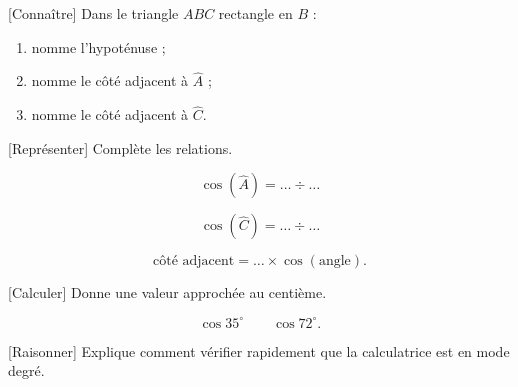 \documentclass[12pt,a4paper]{article}
\begin{document}

[Connaître]
Dans le triangle \(ABC\) rectangle en \(B\) : 

\begin{enumerate}[label=\alph*)]
  \item nomme l'hypoténuse ;
  \item nomme le côté adjacent à \(\widehat A\) ;
  \item nomme le côté adjacent à \(\widehat C\).
\end{enumerate}


[Représenter]
Complète les relations. 

\[
\cos(\widehat A)=\ldots\div\ldots
\]

\[
\cos(\widehat C)=\ldots\div\ldots
\]

\[
\text{côté adjacent}
=
\ldots\times\cos(\text{angle}).
\]


[Calculer]
Donne une valeur approchée au centième. 

\[
\cos 35^\circ
\qquad
\cos 72^\circ.
\]


[Raisonner]
Explique comment vérifier rapidement que la calculatrice est en mode degré. 

\end{document}
